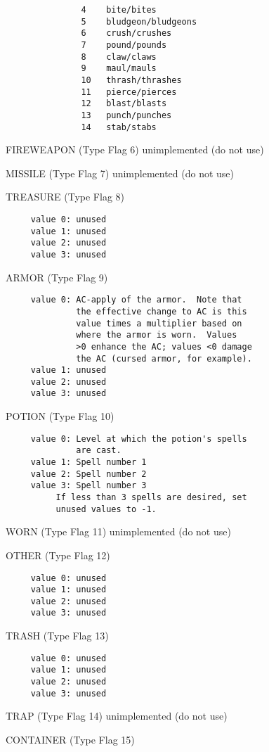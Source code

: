 \documentclass[11pt]{article}
\newenvironment{Ventry}[1]
  {\begin{list}{}{\renewcommand{\makelabel}[1]{\textsf{##1:}\hfil}
    \settowidth{\labelwidth}{\textsf{#1:}}
    \setlength{\leftmargin}{\labelwidth}
    \addtolength{\leftmargin}{\labelsep}
  }
  }
  {\end{list}}
\begin{document}
\begin{Ventry}{DRINK CONTAINER}
\begin{verbatim}
               4    bite/bites
               5    bludgeon/bludgeons
               6    crush/crushes
               7    pound/pounds
               8    claw/claws
               9    maul/mauls
               10   thrash/thrashes
               11   pierce/pierces
               12   blast/blasts
               13   punch/punches
               14   stab/stabs
\end{verbatim}
\item[FIREWEAPON] (Type Flag 6) unimplemented (do not use)
\item[MISSILE] (Type Flag 7) unimplemented (do not use)
\item[TREASURE] (Type Flag 8)
\begin{verbatim}
     value 0: unused
     value 1: unused
     value 2: unused
     value 3: unused
\end{verbatim}
\item[ARMOR] (Type Flag 9)
\begin{verbatim}
     value 0: AC-apply of the armor.  Note that
              the effective change to AC is this
              value times a multiplier based on
              where the armor is worn.  Values
              >0 enhance the AC; values <0 damage
              the AC (cursed armor, for example).
     value 1: unused
     value 2: unused
     value 3: unused
\end{verbatim}
\item[POTION] (Type Flag 10)
\begin{verbatim}
     value 0: Level at which the potion's spells
              are cast.
     value 1: Spell number 1
     value 2: Spell number 2
     value 3: Spell number 3
          If less than 3 spells are desired, set
          unused values to -1.
\end{verbatim}
\item[WORN] (Type Flag 11) unimplemented (do not use)
\item[OTHER] (Type Flag 12)
\begin{verbatim}
     value 0: unused
     value 1: unused
     value 2: unused
     value 3: unused
\end{verbatim}
\item[TRASH] (Type Flag 13)
\begin{verbatim}
     value 0: unused
     value 1: unused
     value 2: unused
     value 3: unused
\end{verbatim}
\item[TRAP] (Type Flag 14) unimplemented (do not use)
\item[ CONTAINER] (Type Flag 15)

\end{Ventry}
\end{document}

